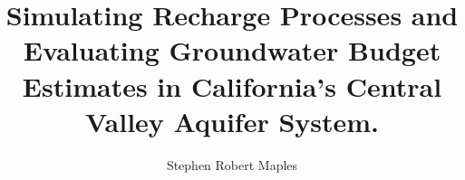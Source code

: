 


\title{Simulating Recharge Processes and Evaluating Groundwater Budget Estimates in California's Central Valley Aquifer System.}

\author{Stephen Robert Maples}










